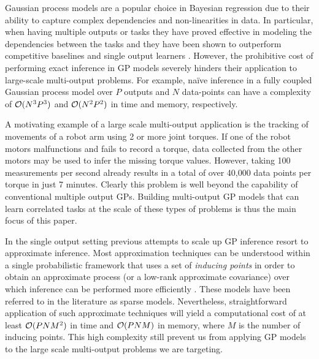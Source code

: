 Gaussian process models  \citep[GPs,][]{rasmussen-williams-book}  are a popular choice in 
Bayesian regression due to their ability to capture complex dependencies and non-linearities in data.
In particular, when having multiple outputs or tasks they have proved effective in modeling 
the dependencies between the tasks  and  they have been shown to outperform competitive baselines and 
single output learners  \citep{bonilla-et-al-nips-08,teh-et-al-aistats-05,alvarez-lawrence-nips-08,wilson-et-al-icml-12}.
However, the prohibitive cost of performing exact inference in  GP models severely hinders 
their application to  large-scale multi-output problems. For example, na\"{i}ve inference 
in a fully coupled Gaussian process model over $P$  outputs and $N$ data-points can have 
a complexity of $\mathcal{O}(N^3P^3)$  and $\mathcal{O}(N^2P^2)$ in time and memory, respectively.


A motivating  example of a large scale multi-output application 
is the tracking of  movements of a robot arm using 2 or more joint torques. 
If one of the robot motors malfunctions and fails to record a torque, data collected from the 
other motors may be used to infer the missing torque values.
However, taking 100 measurements per second already results in a total of over 40,000 data points 
per torque in just 7 minutes.
Clearly this problem is well beyond the capability of conventional multiple output GPs.
Building  multi-output GP models that can learn correlated tasks at the scale of 
these types of problems  is thus the main focus of this paper.

In the single output setting previous attempts to scale up  GP inference 
resort to approximate inference. Most  approximation techniques 
 can be understood 
within a single probabilistic framework that uses a set of \emph{inducing points}  in order to 
obtain an approximate process (or a low-rank approximate covariance) over which inference can be 
performed more efficiently \citep{quinonero2005unifying}. These models have been referred 
to in the literature as sparse models. 
Nevertheless, straightforward application of such approximate techniques will yield a computational 
cost of at least $\mathcal{O}(PNM^2)$ in time and  $\mathcal{O}(PNM)$ in memory, where 
$M$ is the number of inducing points. This high complexity still prevent us from applying GP models 
to the large scale multi-output problems we are targeting.

